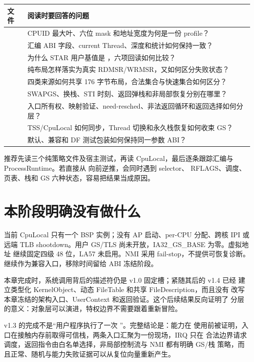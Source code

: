 \begin{longtable}{L{0.43\textwidth}L{0.45\textwidth}}
\toprule
文件 & 阅读时要回答的问题\\
\midrule
{} &
CPUID 最大叶、六位 mask 和地址宽度为何是一份 profile？\\
 &
汇编 ABI 字段、current Thread、深度和统计如何保持一致？\\
 &
为什么 STAR 用户基值是 ，六项回读如何比较？\\
 &
纯布局怎样落实为真实 RDMSR/WRMSR，又如何区分失败状态？\\
 &
四类来源如何共享 176 字节布局，合法集合与快速集合如何区分？\\
 &
SWAPGS、换栈、STI 时刻、返回弹栈和非局部恢复分别在哪里？\\
 &
入口所有权、映射验证、need-resched、非法返回循环和返回选择如何分层？\\
 &
TSS/CpuLocal 如何同步，Thread 切换和永久栈恢复如何收束 GS？\\
 &
默认、兼容和 DF 测试包装如何保持同一参数 ABI？\\
\bottomrule
\end{longtable}

推荐先读三个纯策略文件及宿主测试，再读 CpuLocal，最后逐条跟踪汇编与
ProcessRuntime。若直接从  向前逆推，会同时遇到 selector、
RFLAGS、调度、页表、栈和 GS 六种状态，容易把结果当成原因。

\section{本阶段明确没有做什么}

当前 CpuLocal 只有一个 BSP 实例；没有 AP 启动、per-CPU 分配、跨核 IPI 或
远端 TLB shootdown。用户 GS/TLS 尚未开放，IA32\_GS\_BASE 为零。虚拟地址
继续固定四级 48 位，LA57 未启用。NMI 采用 fail-stop，不提供可恢复诊断。
 继续作为兼容入口，移除时间留给 ABI 冻结阶段。

本章完成时，系统调用背后的描述符仍是 v1.0 固定槽；紧随其后的 v1.4 已经
建立类型化 KernelObject、动态 FileTable 和共享 FileDescription，而且没有
改写本章冻结的架构入口、UserContext 和返回验证。这个后续结果反向证明了
分层的意义：对象层可以演进，特权边界不需要跟着重新冒险。

\begin{keyidea}
v1.3 的完成不是“用户程序执行了一次 ”。完整结论是：能力在
使用前被证明，入口在接触内存前取得可信栈，两条入口汇聚为一份现场，IRQ 只在
合法边界请求调度，返回指令由白名单选择，非局部控制流与 NMI 都有明确 GS/栈
策略，而且正常、随机与能力失败证据可以从复位向量重新产生。
\end{keyidea}
